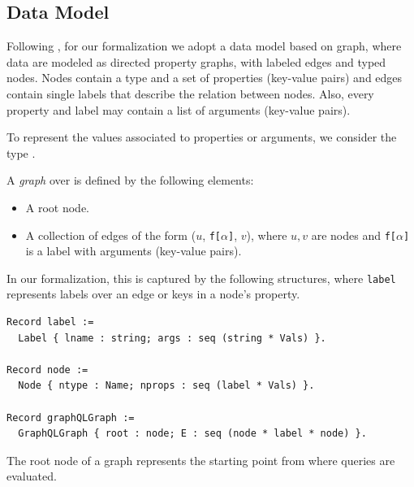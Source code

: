 \subsection{Data Model}\label{subsec:graph}
Following \HP, for our formalization we adopt a data model based on graph, where data are modeled as directed property graphs, with labeled edges and typed nodes. Nodes contain a type and a set of properties (key-value pairs) and  edges contain single labels that describe the relation between nodes. Also, every property and label may contain a list of arguments (key-value pairs).

To represent the values associated to properties or arguments, we consider the type \Vals. 

\begin{definition}
A \emph{\gql graph} over \Vals{} is defined by the following elements:
\begin{itemize}
    \item A root node.
    \item A collection of edges of the form ($u$, \texttt{f[}$\alpha$\texttt{]}, $v$), where $u, v$ are nodes and \texttt{f[}$\alpha$\texttt{]} is a label with arguments (key-value pairs).
\end{itemize}
\end{definition}

In our formalization, this is captured by the following structures, where \texttt{label} represents labels over an edge or keys in a node's property. 
%
\begin{verbatim}
Record label := 
  Label { lname : string; args : seq (string * Vals) }.

Record node := 
  Node { ntype : Name; nprops : seq (label * Vals) }.

Record graphQLGraph := 
  GraphQLGraph { root : node; E : seq (node * label * node) }.
\end{verbatim}
%
 The root node of a \gql graph represents the starting point from where queries are evaluated.

